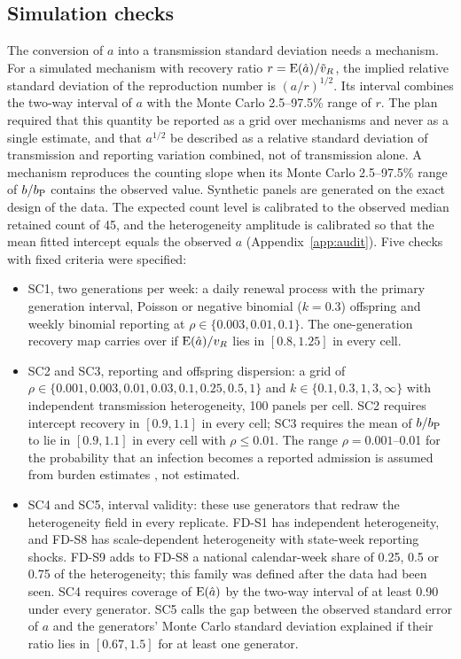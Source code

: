 \subsection{Simulation checks}
\label{sec:diag-sim}

The conversion of $a$ into a transmission standard deviation needs a mechanism. For a simulated mechanism with recovery ratio $r=\operatorname{E}(\hat a)/\tilde v_R$, the implied relative standard deviation of the reproduction number is $(a/r)^{1/2}$. Its interval combines the two-way interval of $a$ with the Monte Carlo 2.5--97.5\% range of $r$. The plan required that this quantity be reported as a grid over mechanisms and never as a single estimate, and that $a^{1/2}$ be described as a relative standard deviation of transmission and reporting variation combined, not of transmission alone. A mechanism reproduces the counting slope when its Monte Carlo 2.5--97.5\% range of $b/b_{\mathrm P}$ contains the observed value. Synthetic panels are generated on the exact design of the data. The expected count level is calibrated to the observed median retained count of 45, and the heterogeneity amplitude is calibrated so that the mean fitted intercept equals the observed $a$ (Appendix~\ref{app:audit}). Five checks with fixed criteria were specified:
\begin{itemize}
\item SC1, two generations per week: a daily renewal process with the primary generation interval, Poisson or negative binomial ($k=0.3$) offspring and weekly binomial reporting at $\rho\in\{0.003,0.01,0.1\}$. The one-generation recovery map carries over if $\operatorname{E}(\hat a)/v_R$ lies in $[0.8,1.25]$ in every cell.
\item SC2 and SC3, reporting and offspring dispersion: a grid of $\rho\in\{0.001,0.003,0.01,0.03,0.1,0.25,0.5,1\}$ and $k\in\{0.1,0.3,1,3,\infty\}$ with independent transmission heterogeneity, 100 panels per cell. SC2 requires intercept recovery in $[0.9,1.1]$ in every cell; SC3 requires the mean of $b/b_{\mathrm P}$ to lie in $[0.9,1.1]$ in every cell with $\rho\le0.01$. The range $\rho=0.001$--0.01 for the probability that an infection becomes a reported admission is assumed from burden estimates \citep{reed2015estimating, hayward2014comparative}, not estimated.
\item SC4 and SC5, interval validity: these use generators that redraw the heterogeneity field in every replicate. FD-S1 has independent heterogeneity, and FD-S8 has scale-dependent heterogeneity with state-week reporting shocks. FD-S9 adds to FD-S8 a national calendar-week share of 0.25, 0.5 or 0.75 of the heterogeneity; this family was defined after the data had been seen. SC4 requires coverage of $\operatorname{E}(\hat a)$ by the two-way interval of at least 0.90 under every generator. SC5 calls the gap between the observed standard error of $a$ and the generators' Monte Carlo standard deviation explained if their ratio lies in $[0.67,1.5]$ for at least one generator.
\end{itemize}

